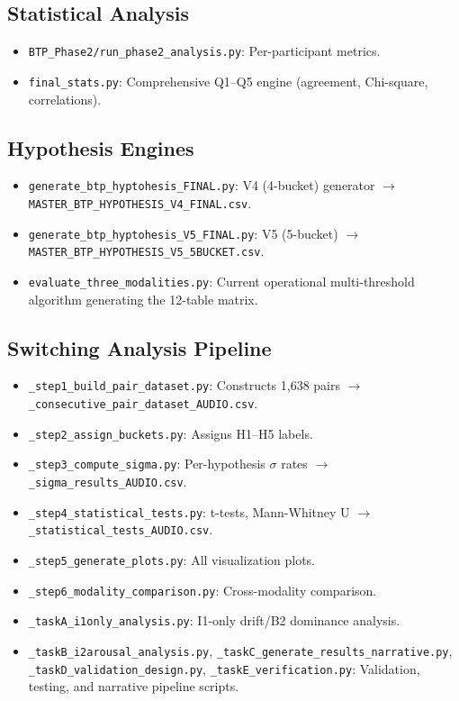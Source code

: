 \documentclass[11pt, a4paper]{report}
\begin{document}
\subsection{Statistical Analysis}
\begin{itemize}
    \item \texttt{BTP\_Phase2/run\_phase2\_analysis.py}: Per-participant metrics.
    \item \texttt{final\_stats.py}: Comprehensive Q1--Q5 engine (agreement, Chi-square, correlations).
\end{itemize}

\subsection{Hypothesis Engines}
\begin{itemize}
    \item \texttt{generate\_btp\_hyptohesis\_FINAL.py}: V4 (4-bucket) generator $\rightarrow$ \texttt{MASTER\_BTP\_HYPOTHESIS\_V4\_FINAL.csv}.
    \item \texttt{generate\_btp\_hyptohesis\_V5\_FINAL.py}: V5 (5-bucket) $\rightarrow$ \texttt{MASTER\_BTP\_HYPOTHESIS\_V5\_5BUCKET.csv}.
    \item \texttt{evaluate\_three\_modalities.py}: Current operational multi-threshold algorithm generating the 12-table matrix.
\end{itemize}

\subsection{Switching Analysis Pipeline}
\begin{itemize}
    \item \texttt{\_step1\_build\_pair\_dataset.py}: Constructs 1,638 pairs $\rightarrow$ \texttt{\_consecutive\_pair\_dataset\_AUDIO.csv}.
    \item \texttt{\_step2\_assign\_buckets.py}: Assigns H1--H5 labels.
    \item \texttt{\_step3\_compute\_sigma.py}: Per-hypothesis $\sigma$ rates $\rightarrow$ \texttt{\_sigma\_results\_AUDIO.csv}.
    \item \texttt{\_step4\_statistical\_tests.py}: t-tests, Mann-Whitney U $\rightarrow$ \texttt{\_statistical\_tests\_AUDIO.csv}.
    \item \texttt{\_step5\_generate\_plots.py}: All visualization plots.
    \item \texttt{\_step6\_modality\_comparison.py}: Cross-modality comparison.
    \item \texttt{\_taskA\_i1only\_analysis.py}: I1-only drift/B2 dominance analysis.
    \item \texttt{\_taskB\_i2arousal\_analysis.py}, \texttt{\_taskC\_generate\_results\_narrative.py}, \texttt{\_taskD\_validation\_design.py}, \texttt{\_taskE\_verification.py}: Validation, testing, and narrative pipeline scripts.
\end{itemize}
\end{document}
